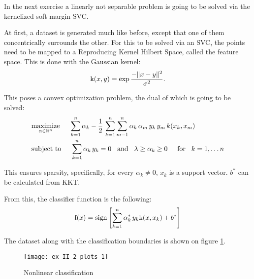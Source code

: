 In the next exercise a linearly not separable problem is going to be solved
via the kernelized soft margin SVC.

At first, a dataset is generated much like before, except that one of them concentrically
surrounds the other. For this to be solved via an SVC, the points need to be mapped
to a Reproducing Kernel Hilbert Space, called the feature space.
This is done with the Gaussian kernel:
\begin{equation}
	\mathrm{k}(x, y) = \exp\frac{-\lVert x-y\rVert^2}{\sigma^2}.
\end{equation}

This poses a convex optimization problem, the dual of which is going to be solved:
\begin{equation}
\begin{split}
	&\underset{\alpha\in\mathbb{R}^n}{\operatorname{maximize}}\hspace{5mm}
		\sum\limits_{k=1}^n\alpha_k - \frac{1}{2}\,\sum\limits_{k=1}^n\sum\limits_{m=1}^n\alpha_k\,\alpha_m\,y_k\,y_m\,k(x_k, x_m)\\
	&\text{subject to}\hspace{5mm}
		\sum\limits_{k=1}^n\alpha_k\,y_k=0\hspace{3mm}\text{and}\hspace{3mm}\lambda\geq\alpha_k\geq0\hspace{5mm}\text{for}\hspace{3mm} k=1,\dots n
\end{split}
\end{equation}

This ensures sparsity, specifically, for every $\alpha_k\neq0$, $x_k$ is a support vector.
$b^*$ can be calculated from KKT.

From this, the classifier function is the following:
\begin{equation}
	\mathrm{f}(x) = \operatorname{sign}\left[\sum\limits_{k=1}^n\alpha_k^*\,y_k\mathrm{k}(x, x_k) + b^*\right]
\end{equation}

The dataset along with the classification boundaries is shown on figure \ref{fig:kernel-SVC}.

\begin{figure}[H]
	\centering
	\texttt{[image: ex\_II\_2\_plots\_1]}
	\caption{Nonlinear classification}
	\label{fig:kernel-SVC}
\end{figure}

